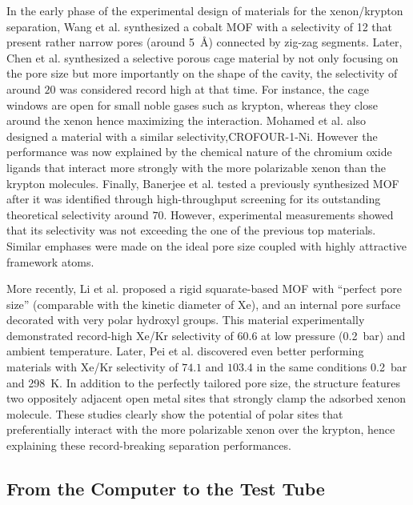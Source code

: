 \documentclass[main.tex]{subfiles}
\begin{document}
In the early phase of the experimental design of materials for the xenon/krypton separation, Wang et al. synthesized a cobalt MOF  with a selectivity of 12 that present rather narrow pores (around \SI{5}{\angstrom}) connected by zig-zag segments.\cite{Wang_2014} Later, Chen et al. synthesized a selective porous cage material by not only focusing on the pore size but more importantly on the shape of the cavity, the selectivity of around $20$ was considered record high at that time. For instance, the cage windows are open for small noble gases such as krypton, whereas they close around the xenon hence maximizing the interaction.\cite{Chen_2014} Mohamed et al. also designed a material with a similar selectivity,CROFOUR-1-Ni. However the performance was now explained by the chemical nature of the chromium oxide ligands that interact more strongly with the more polarizable xenon than the krypton molecules.\cite{Mohamed_2016} Finally, Banerjee et al. tested a previously synthesized\cite{KAXQIL} MOF after it was identified through high-throughput screening\cite{Simon_2015} for its outstanding theoretical selectivity around $70$. However, experimental measurements showed that its selectivity was not exceeding the one of the previous top materials. Similar emphases were made on the ideal pore size coupled with highly attractive framework atoms.\cite{Banerjee_2016}

More recently, Li et al. proposed a rigid squarate-based MOF with ``perfect pore size'' (comparable with the kinetic diameter of Xe), and an internal pore surface decorated with very polar hydroxyl groups. This material experimentally demonstrated record-high Xe/Kr selectivity of $60.6$ at low pressure (\SI{0.2}{\bar}) and ambient temperature.\cite{Li_2019} Later, Pei et al. discovered even better performing materials with Xe/Kr selectivity of $74.1$ and $103.4$ in the same conditions \SI{0.2}{\bar} and \SI{298}{\kelvin}. In addition to the perfectly tailored pore size, the structure features two oppositely adjacent open metal sites that strongly clamp the adsorbed xenon molecule.\cite{Pei_2022} These studies clearly show the potential of polar sites that preferentially interact with the more polarizable xenon over the krypton, hence explaining these record-breaking separation performances. 

\subsection{From the Computer to the Test Tube}
\end{document}
